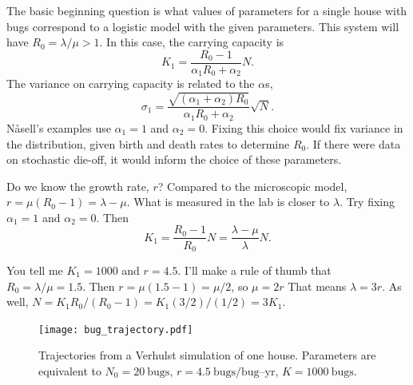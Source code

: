 \documentclass{article}
\begin{document}
The basic beginning question is what values of parameters for
a single house with bugs correspond to a logistic model with the given
parameters. This system will have $R_0=\lambda/\mu>1$. In this
case, the carrying capacity is
\begin{equation}
  K_1=\frac{R_0-1}{\alpha_1 R_0+\alpha_2}N.
\end{equation}
The variance on carrying capacity is related to the $\alpha$s,
\begin{equation}
  \sigma_1=\frac{\sqrt{(\alpha_1+\alpha_2)R_0}}{\alpha_1R_0+\alpha_2}\sqrt{N}.
\end{equation}
N{\aa}sell's examples use $\alpha_1=1$ and $\alpha_2=0$. 
Fixing this choice would fix variance in the distribution, given birth
and death rates to determine $R_0$. If there were data on stochastic die-off,
it would inform the choice of these parameters.

Do we know the growth rate, $r$? Compared to the microscopic model,
$r=\mu(R_0-1)=\lambda-\mu$. What is measured in the lab is closer to $\lambda$.
Try fixing $\alpha_1=1$ and $\alpha_2=0$. Then
\begin{equation}
  K_1=\frac{R_0-1}{R_0}N=\frac{\lambda-\mu}{\lambda}N.
\end{equation}

You tell me $K_1=1000$ and $r=4.5$. I'll make a rule
of thumb that $R_0=\lambda/\mu=1.5$. Then $r=\mu(1.5-1)=\mu/2$,
so $\mu=2r$ That means $\lambda=3r$. As well,
$N=K_1 R_0/(R_0-1)=K_1 (3/2)/(1/2)=3K_1$.


\begin{figure}
\centerline{\texttt{[image: bug\_trajectory.pdf]}}
\caption{Trajectories from a Verhulst simulation of one
house. Parameters are equivalent to
$N_0=20\:\mbox{bugs}$, $r=4.5\:\mbox{bugs/bug--yr}$, $K=1000\:\mbox{bugs}.$\label{fig:bug_trajectory}}
\end{figure}



\end{document}

